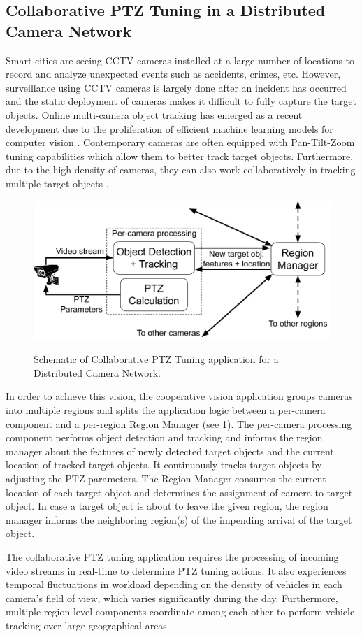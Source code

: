 \subsection{Collaborative PTZ Tuning in a Distributed Camera Network}
Smart cities are seeing CCTV cameras installed at a large number of locations to record and analyze unexpected events such as accidents, crimes, etc. However, surveillance using CCTV cameras is largely done after an incident has occurred and the static deployment of cameras makes it difficult to fully capture the target objects. Online multi-camera object tracking has emerged as a recent development due to the proliferation of efficient machine learning models for computer vision \cite{coralpie}. Contemporary cameras are often equipped with Pan-Tilt-Zoom tuning capabilities which allow them to better track target objects. Furthermore, due to the high density of cameras, they can also work collaboratively in tracking multiple target objects \cite{matsuyama2002real}.
\begin{figure}[h]
\centering
\includegraphics[width=0.75\columnwidth]{figures/apps/multi_cam_ptz}
\label{fig:multi_cam_ptz_app}
\caption{Schematic of Collaborative PTZ Tuning application for a Distributed Camera Network.}
\end{figure}
\par In order to achieve this vision, the cooperative vision application groups cameras into multiple regions and splits the application logic between a per-camera component and a per-region Region Manager (see \cref{fig:multi_cam_ptz_app}). The per-camera processing component performs object detection and tracking and informs the region manager about the features of newly detected target objects and the current location of tracked target objects. It continuously tracks target objects by adjusting the PTZ parameters. The Region Manager consumes the current location of each target object and determines the assignment of camera to target object. In case a target object is about to leave the given region, the region manager informs the neighboring region(s) of the impending arrival of the target object.
\par The collaborative PTZ tuning application requires the processing of incoming video streams in real-time to determine PTZ tuning actions. It also experiences temporal fluctuations in workload depending on the density of vehicles in each camera's field of view, which varies significantly during the day. Furthermore, multiple region-level components coordinate among each other to perform vehicle tracking over large geographical areas.

